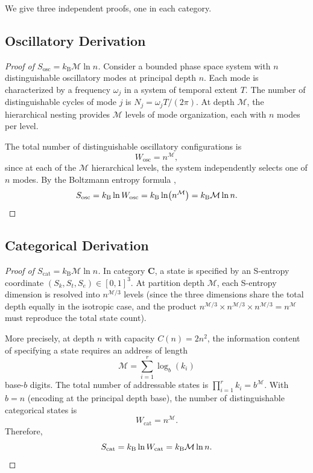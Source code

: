 \documentclass[twocolumn,10pt]{article}
\theoremstyle{remark}
\newcommand{\kB}{k_{\mathrm{B}}}
\newcommand{\Depth}{\mathcal{M}}
\newcommand{\Sk}{S_k}
\newcommand{\St}{S_t}
\newcommand{\Se}{S_e}
\newcommand{\CatC}{\mathbf{C}}
\begin{document}
We give three independent proofs, one in each category.

\subsection{Oscillatory Derivation}

\begin{proof}[Proof of $S_{\mathrm{osc}} = \kB \Depth \ln n$]
Consider a bounded phase space system with $n$ distinguishable oscillatory modes at principal depth $n$.
Each mode is characterized by a frequency $\omega_j$ in a system of temporal extent $T$.
The number of distinguishable cycles of mode $j$ is $N_j = \omega_j T / (2\pi)$.
At depth $\Depth$, the hierarchical nesting provides $\Depth$ levels of mode organization, each with $n$ modes per level.

The total number of distinguishable oscillatory configurations is
\begin{equation}
W_{\mathrm{osc}} = n^{\Depth},
\end{equation}
since at each of the $\Depth$ hierarchical levels, the system independently selects one of $n$ modes.
By the Boltzmann entropy formula \cite{boltzmann1877},
\begin{equation}
S_{\mathrm{osc}} = \kB \ln W_{\mathrm{osc}} = \kB \ln(n^{\Depth}) = \kB \Depth \ln n. \qedhere
\end{equation}
\end{proof}

\subsection{Categorical Derivation}

\begin{proof}[Proof of $S_{\mathrm{cat}} = \kB \Depth \ln n$]
In category $\CatC$, a state is specified by an S-entropy coordinate $(\Sk,\St,\Se) \in [0,1]^3$.
At partition depth $\Depth$, each S-entropy dimension is resolved into $n^{\Depth/3}$ levels (since the three dimensions share the total depth equally in the isotropic case, and the product $n^{\Depth/3} \times n^{\Depth/3} \times n^{\Depth/3} = n^{\Depth}$ must reproduce the total state count).

More precisely, at depth $n$ with capacity $C(n) = 2n^2$, the information content of specifying a state requires an address of length
\begin{equation}
\Depth = \sum_{i=1}^{r} \log_b(k_i)
\end{equation}
base-$b$ digits.
The total number of addressable states is $\prod_{i=1}^{r} k_i = b^{\Depth}$.
With $b = n$ (encoding at the principal depth base), the number of distinguishable categorical states is
\begin{equation}
W_{\mathrm{cat}} = n^{\Depth}.
\end{equation}
Therefore,
\begin{equation}
S_{\mathrm{cat}} = \kB \ln W_{\mathrm{cat}} = \kB \Depth \ln n. \qedhere
\end{equation}
\end{proof}
\end{document}
